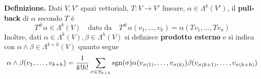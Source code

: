 \textbf{Definizione.} Dati $V,V'$ spazi vettoriali, $T \colon V \to V'$ lineare, $\alpha \in \Lambda^k (V')$, il \textbf{pull-back} di $\alpha$ secondo $T$ è
%
$$
T^\# \alpha \in \Lambda^k(V) \quad \text{dato da} \quad T^\# \alpha(v_1,\ldots,v_k) = \alpha(Tv_1,\ldots,Tv_n)
$$
%
Inoltre, dati $\alpha \in \Lambda^k(V), \beta \in \Lambda^h(V)$ si definisce \textbf{prodotto esterno} e si indica con $\alpha \wedge \beta \in \Lambda^{k+h}(V)$ quanto segue
%
$$
	\alpha \wedge \beta (v_1,\ldots,v_{k+h}) = \frac{1}{k!h!} \sum_{\sigma \in S_{k+h}} \operatorname{sgn} (\sigma) \alpha(v_{\sigma(1)},\ldots,v_{\sigma(k)}) \beta(v_{\sigma(k+1)},\ldots,v_{\sigma(k+h)})
$$
%
